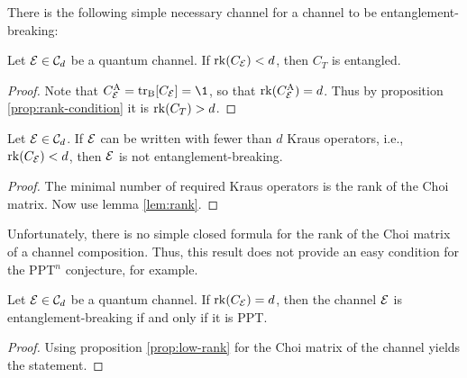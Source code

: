There is the following simple necessary channel for a channel to be entanglement-breaking:
\begin{lemma}\label{lem:rank}
    Let $\mathcal E \in \mathcal C_d$ be a quantum channel. If $\mathrm{rk}(C_{\mathcal E}) < d$, then $C_T$ is entangled.
\end{lemma}
\begin{proof}
    Note that $C_{\m E}^\text{A} = \tr_\text{B}[C_{\m E}] = \1$, so that $\mathrm{rk}(C_{\mathcal E}^\text{A}) = d$. Thus by proposition \ref{prop:rank-condition} it is $\mathrm{rk}(C_T) > d$.
\end{proof}
\begin{prop}
    Let $\mathcal E \in \mathcal C_d$. If $\mathcal E$ can be written with fewer than $d$ Kraus operators, i.e., $\mathrm{rk}(C_{\mathcal E})<d$, then $\mathcal E$ is not entanglement-breaking.
\end{prop}
\begin{proof}
    The minimal number of required Kraus operators is the rank of the Choi matrix. Now use lemma \ref{lem:rank}.
\end{proof}
Unfortunately, there is no simple closed formula for the rank of the Choi matrix of a channel composition. Thus, this result does not provide an easy condition for the PPT$^n$ conjecture, for example.
\begin{prop}
    Let $\mathcal E \in \mathcal C_d$ be a quantum channel. If $\mathrm{rk}(C_{\mathcal E}) = d$, then the channel $\mathcal E$ is entanglement-breaking if and only if it is PPT.
\end{prop}
\begin{proof}
 Using proposition \ref{prop:low-rank} for the Choi matrix of the channel yields the statement.
\end{proof}

